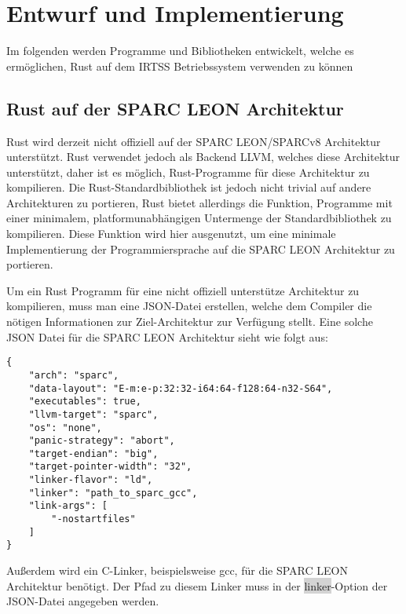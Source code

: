 \chapter{Entwurf und Implementierung}\label{sec:impl}

Im folgenden werden Programme und Bibliotheken entwickelt, welche es ermöglichen, Rust auf dem IRTSS Betriebssystem
verwenden zu können

\section{Rust auf der SPARC LEON Architektur}

Rust wird derzeit nicht offiziell auf der SPARC LEON/SPARCv8 Architektur unterstützt. Rust verwendet jedoch als Backend LLVM,
welches diese Architektur unterstützt, daher ist es möglich, Rust-Programme für diese Architektur zu kompilieren.
Die Rust-Standardbibliothek ist jedoch nicht trivial auf andere Architekturen zu portieren, Rust bietet allerdings die Funktion,
Programme mit einer minimalem, platformunabhängigen Untermenge der Standardbibliothek zu kompilieren. Diese Funktion wird hier
ausgenutzt, um eine minimale Implementierung der Programmiersprache auf die SPARC LEON Architektur zu portieren.



Um ein Rust Programm für eine nicht offiziell unterstütze Architektur zu kompilieren, muss man eine JSON-Datei erstellen, welche
dem Compiler die nötigen Informationen zur Ziel-Architektur zur Verfügung stellt. Eine solche JSON Datei für die
SPARC LEON Architektur sieht wie folgt aus\cite{initialSparcSupportGithub}:
\begin{verbatim}
{
    "arch": "sparc",
    "data-layout": "E-m:e-p:32:32-i64:64-f128:64-n32-S64",
    "executables": true,
    "llvm-target": "sparc",
    "os": "none",
    "panic-strategy": "abort",
    "target-endian": "big",
    "target-pointer-width": "32",
    "linker-flavor": "ld",
    "linker": "path_to_sparc_gcc",
    "link-args": [
        "-nostartfiles"
    ]
}
\end{verbatim}
Außerdem wird ein C-Linker, beispielsweise gcc, für die SPARC LEON Architektur benötigt. Der Pfad zu diesem Linker
muss in der \colorbox{lightgray}{linker}-Option der JSON-Datei angegeben werden.


